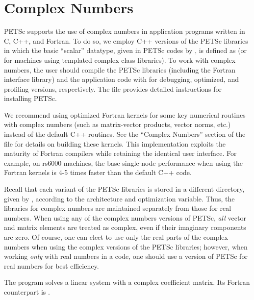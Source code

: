 \section{Complex Numbers}  \label{sec:complex}

PETSc supports the use of complex numbers in application programs
written in C, C++, and Fortran.  To do so, we employ C++ versions of
the PETSc libraries in which the basic ``scalar'' datatype, given in
PETSc codes by , is defined as  (or  for machines using templated complex class
libraries).  To work with complex numbers,
the user should compile the PETSc libraries (including the Fortran
interface library) and the application code with
 for debugging, optimized,
and profiling versions, respectively.  The file 
provides detailed instructions for installing PETSc.

We recommend using optimized Fortran kernels for some key numerical
routines with complex numbers (such as matrix-vector products, vector
norms, etc.) instead of the default C++ routines.  See the ``Complex
Numbers'' section of the file  for
details on building these kernels.  This implementation exploits the
maturity of Fortran compilers while retaining the identical user
interface.  For example, on rs6000 machines, the base single-node
performance when using the Fortran kernels is 4-5 times faster than
the default C++ code.

Recall that each variant of the PETSc libraries is stored in a
different directory, given by
\break {}, according to the
architecture and  optimization variable.  Thus, the libraries for complex
numbers are maintained separately from those for real
numbers.  When using any of the complex numbers versions of PETSc,
{\em all} vector and matrix elements are treated as complex,
even if their imaginary components are zero.
Of course, one can elect to use only the real parts of the complex
numbers when using the complex versions of the PETSc libraries;
however, when working {\em only} with real numbers in a code,
one should use a version of PETSc for real numbers for best efficiency.

The program 
solves a linear system with a complex
coefficient matrix.  Its Fortran counterpart is
.

